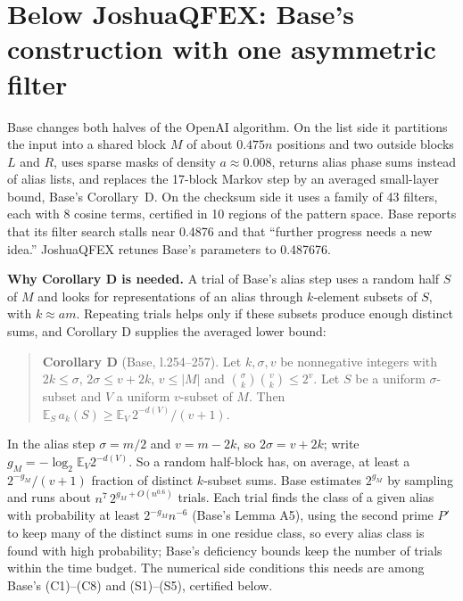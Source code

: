 \documentclass[11pt]{article}
\newcommand{\E}{\mathbb{E}}
\theoremstyle{plain}
\begin{document}
\section{Below JoshuaQFEX: Base's construction with one asymmetric filter}

Base changes both halves of the OpenAI algorithm. On the list side it partitions the input into a shared block $M$ of about $0.475n$ positions and two outside blocks $L$ and $R$, uses sparse masks of density $a \approx 0.008$, returns alias phase sums instead of alias lists, and replaces the 17-block Markov step by an averaged small-layer bound, Base's Corollary~D. On the checksum side it uses a family of 43 filters, each with 8 cosine terms, certified in 10 regions of the pattern space. Base reports that its filter search stalls near 0.4876 and that ``further progress needs a new idea.'' JoshuaQFEX retunes Base's parameters to 0.487676.

\textbf{Why Corollary D is needed.} A trial of Base's alias step uses a random half $S$ of $M$ and looks for representations of an alias through $k$-element subsets of $S$, with $k \approx am$. Repeating trials helps only if these subsets produce enough distinct sums, and Corollary D supplies the averaged lower bound:

\begin{quote}
\textbf{Corollary D} (Base, l.254--257). Let $k, \sigma, v$ be nonnegative integers with $2k \le \sigma$, $2\sigma \le v + 2k$, $v \le |M|$ and $\binom{\sigma}{k}\binom{v}{k} \le 2^v$. Let $S$ be a uniform $\sigma$-subset and $V$ a uniform $v$-subset of $M$. Then $\E_S\, a_k(S) \ge \E_V\, 2^{-d(V)}/(v+1)$.
\end{quote}

In the alias step $\sigma = m/2$ and $v = m - 2k$, so $2\sigma = v + 2k$; write $g_M = -\log_2 \E_V 2^{-d(V)}$. So a random half-block has, on average, at least a $2^{-g_M}/(v+1)$ fraction of distinct $k$-subset sums. Base estimates $2^{g_M}$ by sampling and runs about $n^7\, 2^{g_M + O(n^{0.6})}$ trials. Each trial finds the class of a given alias with probability at least $2^{-g_M} n^{-6}$ (Base's Lemma A5), using the second prime $P'$ to keep many of the distinct sums in one residue class, so every alias class is found with high probability; Base's deficiency bounds keep the number of trials within the time budget. The numerical side conditions this needs are among Base's (C1)--(C8) and (S1)--(S5), certified below.
\end{document}
